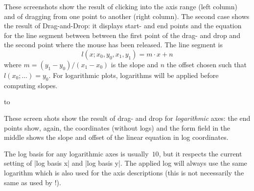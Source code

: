 	\nobreak
	These screenshots show the result of clicking into the axis range (left column) and of dragging from one point to another (right column). The second case shows the result of Drag-and-Drop: it displays start- and end points and the equation for the line segment between between the first point of the drag- and drop and the second point where the mouse has been released. The line segment is
	\[ l(x; x_0,y_0,x_1,y_1) = m \cdot x + n \]
	where $m = (y_1-y_0) / (x_1-x_0)$ is the slope and $n$ the offset chosen such that $l(x_0;\dotsc) = y_0$. For logarithmic plots, logarithms will be applied before computing slopes.

	\noindent
	\hbox to %

	\nobreak
	These screen shots show the result of drag- and drop for \emph{logarithmic} axes: the end points show, again, the coordinates (without logs) and the form field in the middle shows the slope and offset of the linear equation in log coordinates.

	The log basis for any logarithmic axes is usually~$10$, but it respects the current setting of |log basis x| and |log basis y|. The applied log will always use the same logarithm which is also used for the axis descriptions (this is not necessarily the same as used by \PGFPlotstable!).


